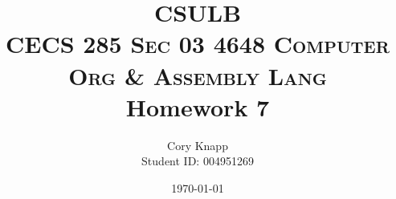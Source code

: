 \documentclass[12pt]{article}
\title{%
\normalfont\normalsize 
\textsc{CSULB} \\  %
\textsc{CECS 285 Sec 03 4648 Computer Org \& Assembly Lang}\\
\huge Homework 7\\ %
}
\author{Cory Knapp\\ Student ID: 004951269} %
\date{\normalsize\today} %
\begin{document}
\begin{mdframed}
\maketitle
\end{mdframed}

\end{document}
